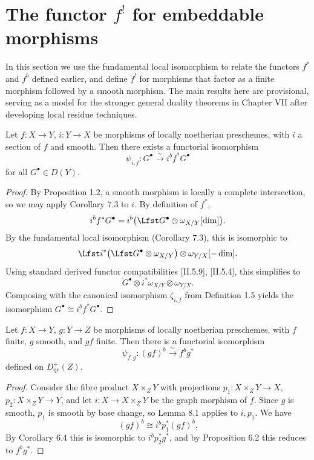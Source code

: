 
\setcounter{page}{184}
\section{The functor \(f^!\) for embeddable morphisms}

In this section we use the fundamental local isomorphism to relate the functors \(f^*\) and \(f^b\) defined earlier, and define \(f^!\) for morphisms that factor as a finite morphism followed by a smooth morphism. The main results here are provisional, serving as a model for the stronger general duality theorems in Chapter VII after developing local residue techniques.

\begin{lemma}
Let \(f\colon X\to Y\), \(i\colon Y\to X\) be morphisms of locally noetherian preschemes, with \(i\) a section of \(f\) and smooth. Then there exists a functorial isomorphism
\[
\psi_{i,f}\colon G^\bullet \stackrel{\sim}{\to} i^b f^* G^\bullet
\]
for all \(G^\bullet\in D(Y)\).
\end{lemma}

\begin{proof}
By Proposition 1.2, a smooth morphism is locally a complete intersection, so we may apply Corollary 7.3 to \(i\). By definition of \(f^*\),
\[
i^b f^* G^\bullet = i^b\big(\Lfst G^\bullet \otimes \omega_{X/Y}[\dim]\big).
\]
By the fundamental local isomorphism (Corollary 7.3), this is isomorphic to
\[
\Lfst i^*\big(\Lfst G^\bullet \otimes \omega_{X/Y}\big) \otimes \omega_{Y/X}[-\dim].
\]
Using standard derived functor compatibilities [II.5.9], [II.5.4], this simplifies to
\[
G^\bullet \otimes i^*\omega_{X/Y} \otimes \omega_{Y/X}.
\]
Composing with the canonical isomorphism \(\zeta_{i,f}\) from Definition 1.5 yields the isomorphism \(G^\bullet\cong i^b f^* G^\bullet\).
\end{proof}

\setcounter{page}{185}
\begin{proposition}
Let \(f\colon X\to Y\), \(g\colon Y\to Z\) be morphisms of locally noetherian preschemes, with \(f\) finite, \(g\) smooth, and \(gf\) finite. Then there is a functorial isomorphism
\[
\psi_{f,g}\colon (gf)^b \stackrel{\sim}{\to} f^b g^*
\]
defined on \(D_{\mathrm{qc}}^+(Z)\).
\end{proposition}

\begin{proof}
Consider the fibre product \(X\times_Z Y\) with projections \(p_1\colon X\times_Z Y\to X\), \(p_2\colon X\times_Z Y\to Y\), and let \(i\colon X\to X\times_Z Y\) be the graph morphism of \(f\). Since \(g\) is smooth, \(p_1\) is smooth by base change, so Lemma 8.1 applies to \(i,p_1\). We have
\[
(gf)^b \cong i^b p_1^*(gf)^b.
\]
By Corollary 6.4 this is isomorphic to \(i^b p_2^* g^*\), and by Proposition 6.2 this reduces to \(f^b g^*\).
\end{proof}

